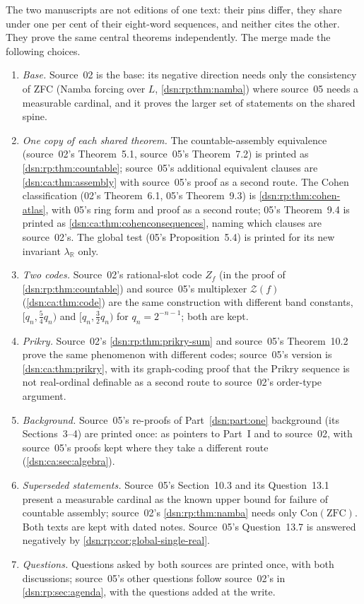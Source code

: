 \documentclass[11pt,a4paper]{article}
\numberwithin{equation}{section}
\theoremstyle{definition}
\theoremstyle{remark}
\newcommand{\ZFC}{\mathrm{ZFC}}
\newcommand{\R}{\mathbb R}
\newcommand{\Zc}{\mathcal Z}
\begin{document}
The two manuscripts are not editions of one text: their pins differ, they
share under one per cent of their eight-word sequences, and neither cites
the other. They prove the same central theorems independently. The merge
made the following choices.
\begin{enumerate}
\item \emph{Base.} Source~02 is the base: its negative direction needs only
the consistency of ZFC (Namba forcing over $L$, \cref{dsn:rp:thm:namba})
where source~05 needs a measurable cardinal, and it proves the larger set of
statements on the shared spine.
\item \emph{One copy of each shared theorem.} The countable-assembly
equivalence (source~02's Theorem~5.1, source~05's Theorem~7.2) is printed
as \cref{dsn:rp:thm:countable}; source~05's additional equivalent clauses
are \cref{dsn:ca:thm:assembly} with source~05's proof as a second route.
The Cohen classification (02's Theorem~6.1, 05's Theorem~9.3) is
\cref{dsn:rp:thm:cohen-atlas}, with 05's ring form and proof as a second
route; 05's Theorem~9.4 is printed as \cref{dsn:ca:thm:cohenconsequences},
naming which clauses are source~02's. The global test (05's
Proposition~5.4) is printed for its new invariant $\lambda_\R$ only.
\item \emph{Two codes.} Source~02's rational-slot code $Z_f$ (in the proof of
\cref{dsn:rp:thm:countable}) and source~05's multiplexer $\Zc(f)$
(\cref{dsn:ca:thm:code}) are the same construction with different band
constants, $[q_n,\tfrac54q_n)$ and $[q_n,\tfrac32q_n)$ for
$q_n=2^{-n-1}$; both are kept.
\item \emph{Prikry.} Source~02's \cref{dsn:rp:thm:prikry-sum} and source~05's
Theorem~10.2 prove the same phenomenon with different codes; source~05's
version is \cref{dsn:ca:thm:prikry}, with its graph-coding proof that the
Prikry sequence is not real-ordinal definable as a second route to
source~02's order-type argument.
\item \emph{Background.} Source~05's re-proofs of Part~\ref{dsn:part:one}
background (its Sections~3--4) are printed once: as pointers to Part~I and
to source~02, with source~05's proofs kept where they take a different
route (\cref{dsn:ca:sec:algebra}).
\item \emph{Superseded statements.} Source~05's Section~10.3 and its
Question~13.1 present a measurable cardinal as the known upper bound for
failure of countable assembly; source~02's \cref{dsn:rp:thm:namba} needs
only $\mathrm{Con}(\ZFC)$. Both texts are kept with dated notes. Source~05's
Question~13.7 is answered negatively by \cref{dsn:rp:cor:global-single-real}.
\item \emph{Questions.} Questions asked by both sources are printed once,
with both discussions; source~05's other questions follow source~02's in
\cref{dsn:rp:sec:agenda}, with the questions added at the write.
\end{enumerate}
\end{document}
